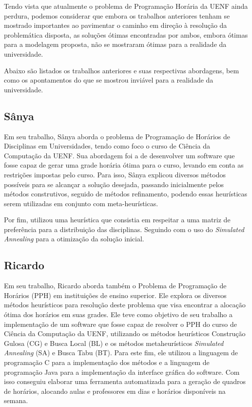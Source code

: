     Tendo vista que atualmente o problema de Programação Horária da UENF ainda perdura, podemos considerar que embora os trabalhos anteriores tenham se mostrado importantes ao pavimentar o caminho em direção à resolução da problemática disposta, as soluções ótimas encontradas por ambos, embora ótimas para a modelagem proposta, não se mostraram ótimas para a realidade da universidade.

    Abaixo são listados os trabalhos anteriores e suas respectivas abordagens, bem como os apontamentos do que se mostrou inviável para a realidade da universidade.

    \subsection{Sânya} %

        Em seu trabalho, Sânya aborda o problema de Programação de Horários de Disciplinas em Universidades, tendo como foco o curso de Ciência da Computação da UENF. Sua abordagem foi a de desenvolver um software que fosse capaz de gerar uma grade horária ótima para o curso, levando em conta as restrições impostas pelo curso. Para isso, Sânya explicou diversos métodos possíveis para se alcançar a solução desejada, passando inicialmente pelos métodos construtivos, seguido de métodos refinamento, podendo essas heurísticas serem utilizadas em conjunto com meta-heurísticas.

        Por fim, utilizou uma heurística que consistia em respeitar a uma matriz de preferência para a distribuição das disciplinas. Seguindo com o uso do \textit{Simulated Annealing} para a otimização da solução inicial.

    \subsection{Ricardo} %

        Em seu trabalho, Ricardo aborda também o Problema de Programação de Horários (PPH) em instituições de ensino superior. Ele explora os diversos métodos heurísticos para resolução deste problema que visa encontrar a alocação ótima dos horários em suas grades. Ele teve como objetivo de seu trabalho a implementação de um software que fosse capaz de resolver o PPH do curso de Ciência da Computação da UENF, utilizando os métodos heurísticos Construção Gulosa (CG) e Busca Local (BL) e os métodos metaheurísticos \textit{Simulated Annealing} (SA) e Busca Tabu (BT). Para este fim, ele utilizou a linguagem de programação C para a implementação dos métodos e a linguagem de programação Java para a implementação da interface gráfica do software. Com isso conseguiu elaborar uma ferramenta automatizada para a geração de quadros de horários, alocando aulas e professores em dias e horários disponíveis na semana.

